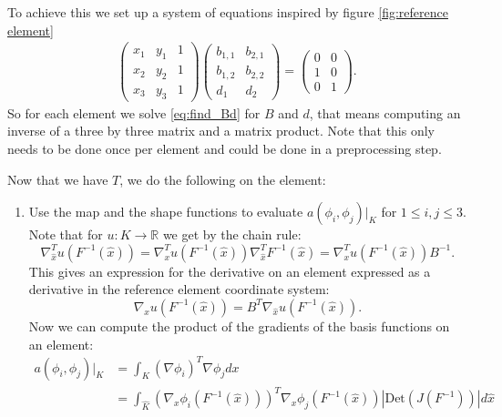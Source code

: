 \documentclass[../Main/main.tex]{subfiles}
\begin{document}
\begin{enumerate}
		To achieve this we set up a system of equations inspired by figure \ref{fig:reference element}
		\begin{gather}\label{eq:find_Bd}
			\begin{pmatrix}
				x_1 & y_1 & 1\\ 
				x_2 & y_2 & 1\\ 
				x_3 & y_3 & 1
			\end{pmatrix}\begin{pmatrix}
				b_{1,1} & b_{2,1}\\ 
				b_{1,2} & b_{2,2}\\ 
				d_1 & d_2
			\end{pmatrix}=
			\begin{pmatrix}
				0 &0 \\ 
				1& 0\\ 
				0 &1 
			\end{pmatrix}.
		\end{gather}
		So for each element we solve \eqref{eq:find_Bd} for $B$ and $d$, that means computing an inverse of a three by three matrix and a matrix product. Note that this only needs to be done once per element and could be done in a preprocessing step. \par
		Now that we have $T$, we do the following on the element:
		\begin{enumerate}
					\item Use the map and the shape functions to evaluate $a(\phi_i,\phi_j)|_K$  for $1\leq i,j \leq 3$. Note that for $u: K \rightarrow \mathbb{R}$ we get by the chain rule:
			\begin{equation}
				\nabla^T_{\hat{x}} u(F^{-1}(\hat{x})) = \nabla^T_{x}u(F^{-1}(\hat{x}))\nabla^T_{\hat{x}} F^{-1}(\hat{x}) =\nabla^T_{x}u(F^{-1}(\hat{x})) B^{-1}.
			\end{equation}
			This gives an expression for the derivative on an element expressed as a derivative in the reference element coordinate system:
			\begin{equation}
				\nabla_{x}u(F^{-1}(\hat{x})) = B^T \nabla_{\hat{x}} u(F^{-1}(\hat{x})).
			\end{equation}
			Now we can compute the product of the gradients of the basis functions on an element:
			\begin{equation}\label{eq:elementgradient}
				\begin{aligned}
					a(\phi_i,\phi_j)|_K &= \int_K (\nabla \phi_i)^T \nabla \phi_j dx\\
					&= \int_{\hat{K}} (\nabla_x \phi_i(F^{-1}(\hat{x})))^T\nabla_x \phi_j(F^{-1}(\hat{x})) |\text{Det}(J(F^{-1}))|d\hat{x}\\

\end{aligned}
\end{equation}
\end{enumerate}
\end{enumerate}
\end{document}
